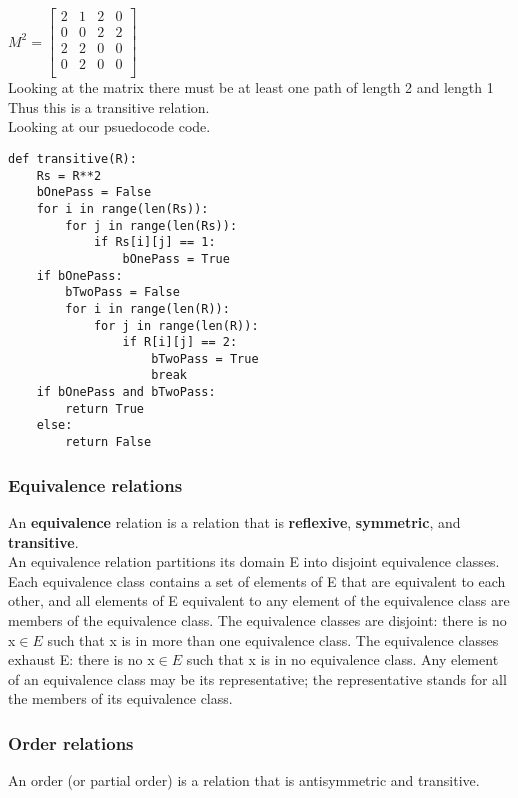$M^2 = \begin{bmatrix}
    2 & 1 & 2 & 0 \\
    0 & 0 & 2 & 2 \\
    2 & 2 & 0 & 0 \\
    0 & 2 & 0 & 0 \\
\end{bmatrix}$ \\

Looking at the matrix there must be at least one path of length 2 and length 1\\
Thus this is a transitive relation. \\

Looking at our psuedocode code. \\

\begin{lstlisting}
def transitive(R):
    Rs = R**2
    bOnePass = False
    for i in range(len(Rs)):
        for j in range(len(Rs)):
            if Rs[i][j] == 1:
                bOnePass = True
    if bOnePass:
        bTwoPass = False
        for i in range(len(R)):
            for j in range(len(R)):
                if R[i][j] == 2:
                    bTwoPass = True
                    break
    if bOnePass and bTwoPass:
        return True
    else:
        return False
\end{lstlisting}
    


\subsubsection{Equivalence relations}
An \textbf{equivalence} relation is a relation that is \textbf{reflexive}, \textbf{symmetric}, and \textbf{transitive}. \\
An equivalence relation partitions its domain E into disjoint equivalence classes. 
Each equivalence class contains a set of elements of E that are equivalent to each other, and all elements of E equivalent to any element of the equivalence class are members of the equivalence class. 
The equivalence classes are disjoint:  there is no x$\in{E}$ such that x is in more than one equivalence class. 
The equivalence classes exhaust E:  there is no x$\in{E}$ such that x is in no equivalence class. 
Any element of an equivalence class may be its representative; the representative stands for all the members of its equivalence class. 

\subsubsection{Order relations}
An order (or partial order) is a relation that is antisymmetric and transitive. 

